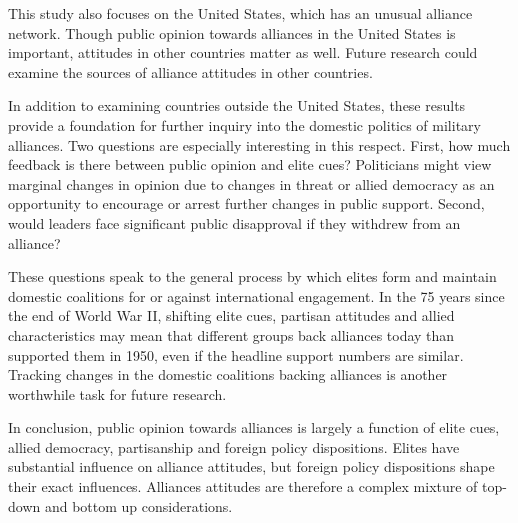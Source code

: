 \documentclass[12pt]{article}
\begin{document}
This study also focuses on the United States, which has an unusual alliance network. 
Though public opinion towards alliances in the United States is important, attitudes in other countries matter as well. 
Future research could examine the sources of alliance attitudes in other countries. 


In addition to examining countries outside the United States, these results provide a foundation for further inquiry into the domestic politics of military alliances. 
Two questions are especially interesting in this respect.
First, how much feedback is there between public opinion and elite cues? 
Politicians might view marginal changes in opinion due to changes in threat or allied democracy as an opportunity to encourage or arrest further changes in public support.
Second, would leaders face significant public disapproval if they withdrew from an alliance? 


These questions speak to the general process by which elites form and maintain domestic coalitions for or against international engagement. 
In the 75 years since the end of World War II, shifting elite cues, partisan attitudes and allied characteristics may mean that different groups back alliances today than supported them in 1950, even if the headline support numbers are similar. 
Tracking changes in the domestic coalitions backing alliances is another worthwhile task for future research.


In conclusion, public opinion towards alliances is largely a function of elite cues, allied democracy, partisanship and foreign policy dispositions.  
Elites have substantial influence on alliance attitudes, but foreign policy dispositions shape their exact influences. 
Alliances attitudes are therefore a complex mixture of top-down and bottom up considerations. 



\newpage

 
 
\end{document}
